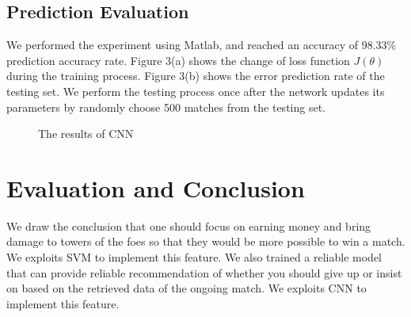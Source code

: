 \documentclass[a4paper, 11pt]{article} %
\begin{document}
\subsection{Prediction Evaluation}
We performed the experiment using Matlab, and reached an accuracy of 98.33\% prediction accuracy rate.
Figure 3(a) shows the change of loss function $J(\theta)$ during the training process. Figure 3(b) shows the error prediction rate of the testing set. We perform the testing process once after the network updates its parameters by randomly choose 500 matches from the testing set.
\begin{figure}[h]
	\centering 
	\caption{The results of CNN}
	\label{fig:subfig}
\end{figure}

\section{Evaluation and Conclusion}
We draw the conclusion that one should focus on earning money and bring damage to towers of the foes so that they would be more possible to win a match. We exploits SVM to implement this feature.
We also trained a reliable model that can provide reliable recommendation of whether you should give up or insist on based on the retrieved data of the ongoing match. We exploits CNN to implement this feature.

\end{document}
